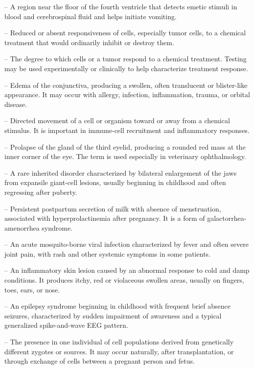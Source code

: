 -- A region near the floor of the fourth ventricle that detects emetic stimuli in blood and cerebrospinal fluid and helps initiate vomiting.

-- Reduced or absent responsiveness of cells, especially tumor cells, to a chemical treatment that would ordinarily inhibit or destroy them.

-- The degree to which cells or a tumor respond to a chemical treatment. Testing may be used experimentally or clinically to help characterize treatment response.

-- Edema of the conjunctiva, producing a swollen, often translucent or blister-like appearance. It may occur with allergy, infection, inflammation, trauma, or orbital disease.

-- Directed movement of a cell or organism toward or away from a chemical stimulus. It is important in immune-cell recruitment and inflammatory responses.

-- Prolapse of the gland of the third eyelid, producing a rounded red mass at the inner corner of the eye. The term is used especially in veterinary ophthalmology.

-- A rare inherited disorder characterized by bilateral enlargement of the jaws from expansile giant-cell lesions, usually beginning in childhood and often regressing after puberty.

-- Persistent postpartum secretion of milk with absence of menstruation, associated with hyperprolactinemia after pregnancy. It is a form of galactorrhea-amenorrhea syndrome.

-- An acute mosquito-borne viral infection characterized by fever and often severe joint pain, with rash and other systemic symptoms in some patients.

-- An inflammatory skin lesion caused by an abnormal response to cold and damp conditions. It produces itchy, red or violaceous swollen areas, usually on fingers, toes, ears, or nose.

-- An epilepsy syndrome beginning in childhood with frequent brief absence seizures, characterized by sudden impairment of awareness and a typical generalized spike-and-wave EEG pattern.

-- The presence in one individual of cell populations derived from genetically different zygotes or sources. It may occur naturally, after transplantation, or through exchange of cells between a pregnant person and fetus.

